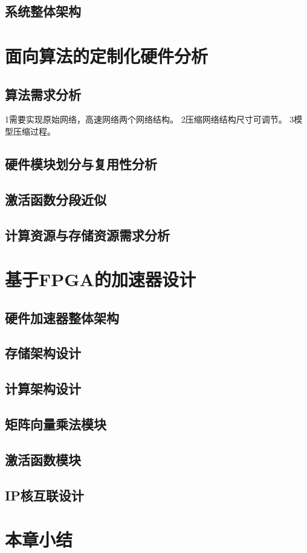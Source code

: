 \subsection{系统整体架构}

\section{面向算法的定制化硬件分析}
\subsection{算法需求分析}
1需要实现原始网络，高速网络两个网络结构。
2压缩网络结构尺寸可调节。
3模型压缩过程。
\subsection{硬件模块划分与复用性分析}
\subsection{激活函数分段近似}
\subsection{计算资源与存储资源需求分析}

\section{基于FPGA的加速器设计}
\subsection{硬件加速器整体架构}

\subsection{存储架构设计}

\subsection{计算架构设计}

\subsection{矩阵向量乘法模块}

\subsection{激活函数模块}

\subsection{IP核互联设计}

\section{本章小结}
